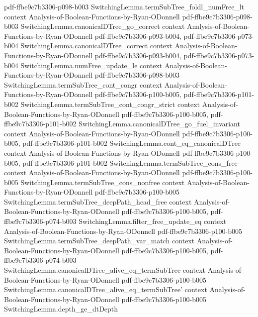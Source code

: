 \begin{lemma}
  {pdf-ffbe9c7b3306-p098-b003}
\proofstep
  {SwitchingLemma.termSubTree_foldl_numFree_lt}
  {context}
  {Analysis-of-Boolean-Functions-by-Ryan-ODonnell}
  {pdf-ffbe9c7b3306-p098-b003}
\proofstep
  {SwitchingLemma.canonicalDTree_go_correct}
  {context}
  {Analysis-of-Boolean-Functions-by-Ryan-ODonnell}
  {pdf-ffbe9c7b3306-p093-b004,
    pdf-ffbe9c7b3306-p073-b004}
\proofstep
  {SwitchingLemma.canonicalDTree_correct}
  {context}
  {Analysis-of-Boolean-Functions-by-Ryan-ODonnell}
  {pdf-ffbe9c7b3306-p093-b004,
    pdf-ffbe9c7b3306-p073-b004}
\proofstep
  {SwitchingLemma.numFree_update_le}
  {context}
  {Analysis-of-Boolean-Functions-by-Ryan-ODonnell}
  {pdf-ffbe9c7b3306-p098-b003}
\proofstep
  {SwitchingLemma.termSubTree_cont_congr}
  {context}
  {Analysis-of-Boolean-Functions-by-Ryan-ODonnell}
  {pdf-ffbe9c7b3306-p100-b005,
    pdf-ffbe9c7b3306-p101-b002}
\proofstep
  {SwitchingLemma.termSubTree_cont_congr_strict}
  {context}
  {Analysis-of-Boolean-Functions-by-Ryan-ODonnell}
  {pdf-ffbe9c7b3306-p100-b005,
    pdf-ffbe9c7b3306-p101-b002}
\proofstep
  {SwitchingLemma.canonicalDTree_go_fuel_invariant}
  {context}
  {Analysis-of-Boolean-Functions-by-Ryan-ODonnell}
  {pdf-ffbe9c7b3306-p100-b005,
    pdf-ffbe9c7b3306-p101-b002}
\proofstep
  {SwitchingLemma.cont_eq_canonicalDTree}
  {context}
  {Analysis-of-Boolean-Functions-by-Ryan-ODonnell}
  {pdf-ffbe9c7b3306-p100-b005,
    pdf-ffbe9c7b3306-p101-b002}
\proofstep
  {SwitchingLemma.termSubTree_cons_free}
  {context}
  {Analysis-of-Boolean-Functions-by-Ryan-ODonnell}
  {pdf-ffbe9c7b3306-p100-b005}
\proofstep
  {SwitchingLemma.termSubTree_cons_nonfree}
  {context}
  {Analysis-of-Boolean-Functions-by-Ryan-ODonnell}
  {pdf-ffbe9c7b3306-p100-b005}
\proofstep
  {SwitchingLemma.termSubTree_deepPath_head_free}
  {context}
  {Analysis-of-Boolean-Functions-by-Ryan-ODonnell}
  {pdf-ffbe9c7b3306-p100-b005,
    pdf-ffbe9c7b3306-p074-b003}
\proofstep
  {SwitchingLemma.filter_free_update_eq}
  {context}
  {Analysis-of-Boolean-Functions-by-Ryan-ODonnell}
  {pdf-ffbe9c7b3306-p100-b005}
\proofstep
  {SwitchingLemma.termSubTree_deepPath_var_match}
  {context}
  {Analysis-of-Boolean-Functions-by-Ryan-ODonnell}
  {pdf-ffbe9c7b3306-p100-b005,
    pdf-ffbe9c7b3306-p074-b003}
\proofstep
  {SwitchingLemma.canonicalDTree_alive_eq_termSubTree}
  {context}
  {Analysis-of-Boolean-Functions-by-Ryan-ODonnell}
  {pdf-ffbe9c7b3306-p100-b005}
\proofstep
  {SwitchingLemma.canonicalDTree_alive_eq_termSubTree'}
  {context}
  {Analysis-of-Boolean-Functions-by-Ryan-ODonnell}
  {pdf-ffbe9c7b3306-p100-b005}
\proofstep
  {SwitchingLemma.depth_ge_dtDepth}

\end{lemma}
